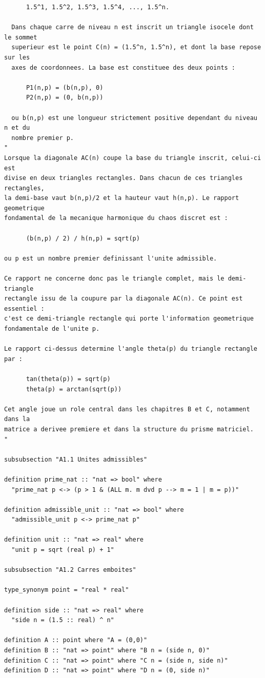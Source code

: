 \documentclass[12pt,a4paper]{article}
\theoremstyle{definition}
\theoremstyle{remark}
\begin{document}
\begin{verbatim}
      1.5^1, 1.5^2, 1.5^3, 1.5^4, ..., 1.5^n.

  Dans chaque carre de niveau n est inscrit un triangle isocele dont le sommet
  superieur est le point C(n) = (1.5^n, 1.5^n), et dont la base repose sur les
  axes de coordonnees. La base est constituee des deux points :

      P1(n,p) = (b(n,p), 0)
      P2(n,p) = (0, b(n,p))

  ou b(n,p) est une longueur strictement positive dependant du niveau n et du
  nombre premier p.
"
Lorsque la diagonale AC(n) coupe la base du triangle inscrit, celui-ci est
divise en deux triangles rectangles. Dans chacun de ces triangles rectangles,
la demi-base vaut b(n,p)/2 et la hauteur vaut h(n,p). Le rapport geometrique
fondamental de la mecanique harmonique du chaos discret est :

      (b(n,p) / 2) / h(n,p) = sqrt(p)

ou p est un nombre premier definissant l'unite admissible.

Ce rapport ne concerne donc pas le triangle complet, mais le demi-triangle
rectangle issu de la coupure par la diagonale AC(n). Ce point est essentiel :
c'est ce demi-triangle rectangle qui porte l'information geometrique
fondamentale de l'unite p.

Le rapport ci-dessus determine l'angle theta(p) du triangle rectangle par :

      tan(theta(p)) = sqrt(p)
      theta(p) = arctan(sqrt(p))

Cet angle joue un role central dans les chapitres B et C, notamment dans la
matrice a derivee premiere et dans la structure du prisme matriciel.
"

subsubsection "A1.1 Unites admissibles"

definition prime_nat :: "nat => bool" where
  "prime_nat p <-> (p > 1 & (ALL m. m dvd p --> m = 1 | m = p))"

definition admissible_unit :: "nat => bool" where
  "admissible_unit p <-> prime_nat p"

definition unit :: "nat => real" where
  "unit p = sqrt (real p) + 1"

subsubsection "A1.2 Carres emboites"

type_synonym point = "real * real"

definition side :: "nat => real" where
  "side n = (1.5 :: real) ^ n"

definition A :: point where "A = (0,0)"
definition B :: "nat => point" where "B n = (side n, 0)"
definition C :: "nat => point" where "C n = (side n, side n)"
definition D :: "nat => point" where "D n = (0, side n)"


\end{verbatim}
\end{document}
